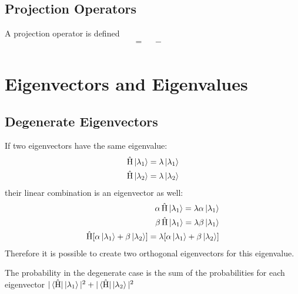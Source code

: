 \documentclass[10pt,a4paper]{book}
\DeclareMathOperator {\opH} {\hat{H}}
\DeclareMathOperator {\opA} {\hat{A}}
\DeclareMathOperator {\opB} {\hat{B}}
\begin{document}
\section{Projection Operators}
A projection operator is defined
\begin{align}
	[\opA, \opB] = \opA\opB - \opB\opA \\
\end{align}
\chapter{Eigenvectors and Eigenvalues}
\section{Degenerate Eigenvectors}
If two eigenvectors have the same eigenvalue:
\begin{align}
	\opH\ket{\lambda_1} = \lambda \ket{\lambda_1} \\
	\opH\ket{\lambda_2} = \lambda \ket{\lambda_2}
\end{align}
their linear combination is an eigenvector as well:
\begin{align}
	\alpha \opH\ket{\lambda_1} = \lambda \alpha \ket{\lambda_1} \\
	\beta \opH\ket{\lambda_1} = \lambda \beta \ket{\lambda_1}   \\
	\opH[\alpha \ket{\lambda_1} + \beta \ket{\lambda_2}] = \lambda [\alpha \ket{\lambda_1} + \beta \ket{\lambda_2}]
\end{align}
Therefore it is possible to create two orthogonal eigenvectors for this eigenvalue.

The probability in the degenerate case is the sum of the probabilities for each eigenvector $| \bra{\opH} \ket{\lambda_1}|^2 + | \bra{\opH} \ket{\lambda_2}|^2$
\end{document}
